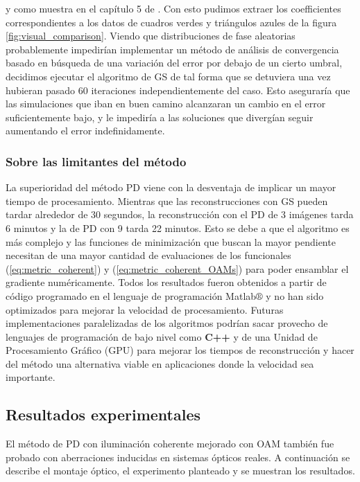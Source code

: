 y como muestra en el capítulo 5 de . Con esto
pudimos extraer los coefficientes correspondientes a los datos de
cuadros verdes y triángulos azules de la figura
\ref{fig:visual_comparison}. 
Viendo que distribuciones de fase aleatorias probablemente impedirían
implementar un método de análisis de convergencia basado en búsqueda
de una variación del error por debajo de un cierto umbral, decidimos
ejecutar el algoritmo de GS de tal forma que se detuviera una vez
hubieran pasado 60 iteraciones independientemente del caso. Esto
aseguraría que las simulaciones que iban en buen camino alcanzaran un
cambio en el error suficientemente bajo, y le impediría a las
soluciones que divergían seguir aumentando el error indefinidamente. 

\subsubsection{Sobre las limitantes del método}
La superioridad del método PD viene con la desventaja de implicar un
mayor tiempo de procesamiento. Mientras que las reconstrucciones con
GS pueden tardar alrededor de 30 segundos, la reconstrucción con el PD
de 3 imágenes tarda 6 minutos y la de PD con 9 tarda 22 minutos. Esto
se debe a que el algoritmo es más complejo y las funciones de
minimización que buscan la mayor pendiente necesitan de una mayor cantidad
de evaluaciones de los funcionales (\ref{eq:metric_coherent}) y
(\ref{eq:metric_coherent_OAMs}) para poder ensamblar el gradiente
numéricamente. Todos los resultados fueron obtenidos a partir de
código programado en el lenguaje de programación Matlab$\circledR$ y
no han sido optimizados para mejorar la velocidad de
procesamiento. Futuras implementaciones paralelizadas de los
algoritmos podrían sacar provecho de lenguajes de programación de bajo
nivel como \textbf{C++} y de una Unidad de Procesamiento Gráfico (GPU)
para mejorar los tiempos de reconstrucción y hacer del método una
alternativa viable en aplicaciones donde la velocidad sea importante. 

\subsection{Resultados experimentales}
\label{sec:ChPD_resultados_experimentales}

El método de PD con iluminación coherente mejorado con OAM también fue
probado con aberraciones inducidas en sistemas ópticos reales. A
continuación se describe el montaje óptico, el experimento planteado y
se muestran los resultados. 

